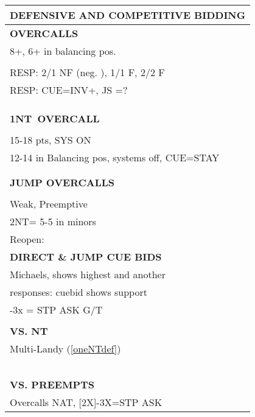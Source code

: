 \documentclass{article}
\newcommand\N{{\footnotesize NT}}
\begin{document}
\noindent
\small{
\begin{minipage}{90mm}
	\begin{tabular}{| p{88mm} |}
		\hline
		\cellcolor[gray]{0.9} \textbf{DEFENSIVE AND COMPETITIVE BIDDING} \\ \hline
		\textbf{OVERCALLS} \\ \hline
                8+, 6+ in balancing pos.
		\\ \hline
		\\ \hline
                RESP: 2/1 NF (neg. ), 1/1 F, 2/2 F
		\\ \hline
                RESP: CUE=INV+, JS =?
		\\ \hline
		\\ \hline
		\\ \hline
		\\ \hline
		\textbf{1\N \ OVERCALL} \\ \hline
		\\ \hline
                15-18 pts, SYS ON
		\\ \hline
                12-14 in Balancing pos, systems off, CUE=STAY
		\\ \hline
		\\ \hline
		\\ \hline
		\textbf{JUMP OVERCALLS} \\ \hline
		\\ \hline
                Weak, Preemptive
		\\ \hline
                2NT= 5-5 in minors
		\\ \hline
		Reopen: \\ \hline
		\textbf{DIRECT \& JUMP CUE BIDS} \\ \hline
                Michaels, shows highest and another
		\\ \hline
                responses: cuebid shows support
		\\ \hline
                [2x]-3x = STP ASK G/T 
		\\ \hline
		\\ \hline
		\textbf{VS. NT} \\ \hline
                Multi-Landy (\ref{oneNTdef})
		\\ \hline
		\\ \hline
		\\ \hline
		\\ \hline
		\\ \hline
		\\ \hline
		\textbf{VS. PREEMPTS} \\ \hline
                Overcalls NAT, [2X]-3X=STP ASK

\end{tabular}
\end{minipage}}
\end{document}
